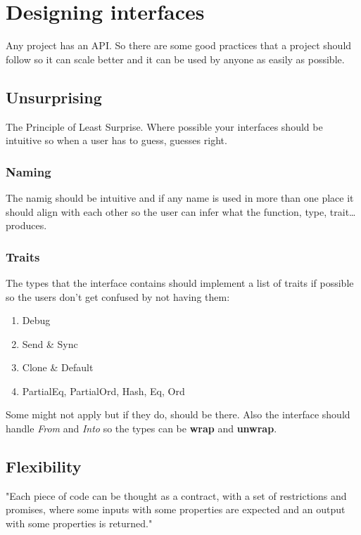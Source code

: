 \section{Designing interfaces}

Any project has an API. So there are some good practices that a project should follow so it can scale better and it can be used by anyone as easily as possible.

\subsection{Unsurprising}

The Principle of Least Surprise. Where possible your interfaces should be intuitive so when a user has to guess, guesses right.

\subsubsection{Naming}

The namig should be intuitive and if any name is used in more than one place it should align with each other so the user can infer what the function, type, trait… produces.

\subsubsection{Traits}

The types that the interface contains should implement a list of traits if possible so the users don't get confused by not having them:

\begin{enumerate}
    \item Debug
    \item Send \& Sync
    \item Clone \& Default
    \item PartialEq, PartialOrd, Hash, Eq, Ord
\end{enumerate}

Some might not apply but if they do, should be there. Also the interface should handle \textit{From} and \textit{Into} so the types can be \textbf{wrap} and \textbf{unwrap}.

\subsection{Flexibility}

"Each piece of code can be thought as a contract,
with a set of restrictions and promises,
where some inputs with some properties are expected and an output with some properties is returned."

